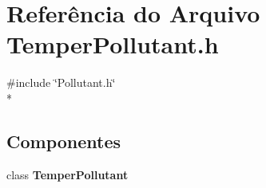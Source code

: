 \section{Referência do Arquivo Temper\+Pollutant.\+h}
\label{_temper_pollutant_8h}
{\ttfamily \#include \char`\"{}Pollutant.\+h\char`\"{}}\\*
\subsection*{Componentes}
\begin{DoxyCompactItemize}
\item 
class {\bf Temper\+Pollutant}
\end{DoxyCompactItemize}
